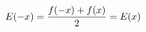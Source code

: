 \documentclass[preview]{standalone}
\begin{document}
\begin{align*}
\special{dvisvgm:raw <g id='unique000'>}E(-x)=\frac{f(-x)+f(x)}{2}=E(x)\special{dvisvgm:raw </g>}
\end{align*}
\end{document}
